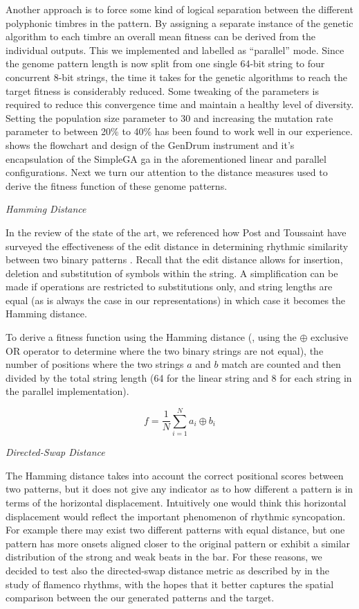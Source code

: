 Another approach is to force some kind of logical separation between the different polyphonic timbres in the pattern. By assigning a separate instance of the genetic algorithm to each timbre an overall mean fitness can be derived from the individual outputs. This we implemented and labelled as ``parallel'' mode. Since the genome pattern length is now split from one single 64-bit string to four concurrent 8-bit strings, the time it takes for the genetic algorithms to reach the target fitness is considerably reduced. Some tweaking of the parameters is required to reduce this convergence time and maintain a healthy level of diversity. Setting the population size parameter to 30 and increasing the mutation rate parameter to between 20\% to 40\% has been found to work well in our experience.  shows the flowchart and design of the GenDrum instrument and it's encapsulation of the SimpleGA \acrshort{ga} in the aforementioned linear and parallel configurations. Next we turn our attention to the distance measures used to derive the fitness function of these genome patterns.

\textit{Hamming Distance}

In the review of the state of the art, we referenced how Post and Toussaint have surveyed the effectiveness of the edit distance in determining rhythmic similarity between two binary patterns \citep{Post2011}. Recall that the edit distance allows for insertion, deletion and substitution of symbols within the string. A simplification can be made if operations are restricted to substitutions only, and string lengths are equal (as is always the case in our representations) in which case it becomes the Hamming distance. 

To derive a fitness function using the Hamming distance (, using the $\oplus$ exclusive OR operator to determine where the two binary strings are not equal), the number of positions where the two strings $a$ and $b$ match are counted and then divided by the total string length (64 for the linear string and 8 for each string in the parallel implementation). 

\begin{equation}
\label{eq:fitness_hamming}
	f=\frac{1}{N}\sum_{i=1}^{N}a_i \oplus b_i
\end{equation}

\textit{Directed-Swap Distance}

The Hamming distance takes into account the correct positional scores between two patterns, but it does not give any indicator as to how different a pattern is in terms of the horizontal displacement. Intuitively one would think this horizontal displacement would reflect the important phenomenon of rhythmic syncopation. For example there may exist two different patterns with equal distance, but one pattern has more onsets aligned closer to the original pattern or exhibit a similar distribution of the strong and weak beats in the bar. For these reasons, we decided to test also the directed-swap distance metric as described by \cite{Diaz-Banez2004} in the study of flamenco rhythms, with the hopes that it better captures the spatial comparison between the our generated patterns and the target.

